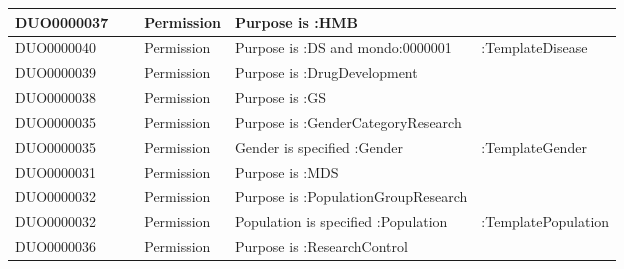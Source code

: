 \begin{table}[htp]
{\begin{tabular}{p{1.7cm}||p{1.2cm}|p{1.45cm}|p{8.6cm}|p{3.1cm}}
DUO0000037 & ~ & Permission & Purpose is :HMB & \\ \hline
DUO0000040 & ~ & Permission & Purpose is :DS and mondo:0000001 & :TemplateDisease \\ \hline
DUO0000039 & ~ & Permission & Purpose is :DrugDevelopment & \\ \hline
DUO0000038 & ~ & Permission & Purpose is :GS & \\ \hline
DUO0000035 & ~ & Permission & Purpose is :GenderCategoryResearch & \\ \hline
DUO0000035 & & Permission & Gender is specified :Gender & :TemplateGender \\ \hline
DUO0000031 & ~ & Permission & Purpose is :MDS & \\ \hline
DUO0000032 & ~ & Permission & Purpose is :PopulationGroupResearch & \\ \hline
DUO0000032 & & Permission & Population is specified :Population & :TemplatePopulation \\ \hline
DUO0000036 & ~ & Permission & Purpose is :ResearchControl & \\
\end{tabular}}
\end{table}


